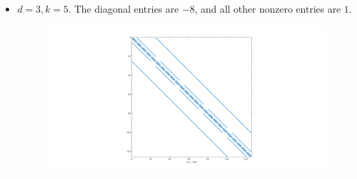 \begin{sol}
\begin{itemize}
\item
  $d=3, k=5$. The diagonal entries are $-8$,
  and all other nonzero entries are $1$.
    \begin{figure}[H]
    \centering
    \includegraphics[scale=0.25]{3d5.png}
  \end{figure}
  \end{itemize}
\end{sol}
